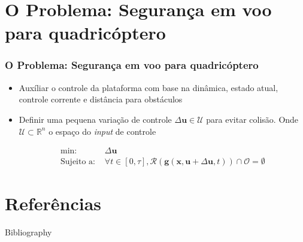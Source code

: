 \documentclass{beamer}
\begin{document}
\section{O Problema: Segurança em voo para quadricóptero}
\begin{frame}
	\frametitle{O Problema: Segurança em voo para quadricóptero}
	
	\begin{itemize}
		
		\item Auxíliar o controle da plataforma com base na dinâmica, estado  atual, controle corrente e distância para obstáculos
		
		\item Definir uma pequena variação de controle $\Delta\mathbf{u} \in \mathcal{U}$ para evitar colisão. Onde $\mathcal{U} \subset \mathbb{R}^{n}$ o espaço do \textit{input} de controle
		
		\begin{equation}
		\begin{aligned}
		\text{min: }& \Delta\mathbf{u} \\
		\text{Sujeito a: }& \forall t \in [0,\tau], \mathcal{R}(\mathbf{g}(\mathbf{x}, \mathbf{u}+\Delta\mathbf{u}, t)) \cap \mathcal{O} = \emptyset
		\end{aligned}
		\label{eq:equacaoProb}
		\end{equation}
		
	\end{itemize}	 
\end{frame}


\section{Referências}
\begin{frame}[allowframebreaks]{Bibliography}
	\frametitle{\insertsection}
	
	\begin{small}
		
	\end{small}
\end{frame}
\end{document}
